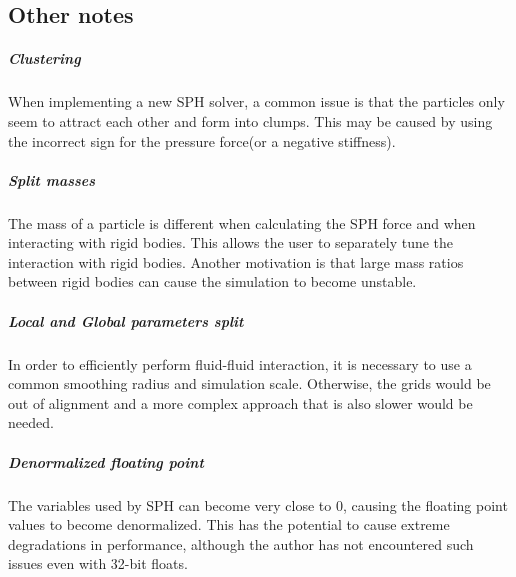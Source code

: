 \documentclass[]{article}
\begin{document}
	\subsection{Other notes}		
		\subparagraph{Clustering}
			When implementing a new SPH solver, a common issue is that the particles only seem to attract each other 
			and form into clumps. This may be caused by using the incorrect sign for the pressure force(or a negative 
			stiffness).
		\subparagraph{Split masses}
			The mass of a particle is different when calculating the SPH force and when interacting with rigid bodies.
			This allows the user to separately tune the interaction with rigid bodies. Another motivation is that large
			mass ratios between rigid bodies can cause the simulation to become unstable.
		\subparagraph{Local and Global parameters split}
			In order to efficiently perform fluid-fluid interaction, it is necessary to use a common smoothing radius 
			and simulation scale. Otherwise, the grids would be out of alignment and a more complex approach that is 
			also slower would be needed.
		\subparagraph{Denormalized floating point}
			The variables used by SPH can become very close to 0, causing the floating point values to become 
			denormalized. This has the potential to cause extreme degradations in performance, although the author has 
			not encountered such issues even with 32-bit floats.


\pagebreak

		
\end{document}
